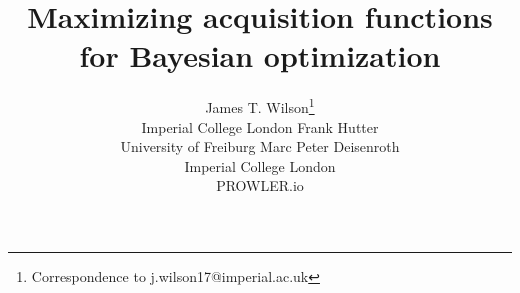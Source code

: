 
\title{Maximizing acquisition functions\\ for Bayesian optimization}
\author{
 	James T. Wilson\thanks{Correspondence to j.wilson17@imperial.ac.uk} \\
    {Imperial College London}
 	\And
 	Frank Hutter\\
    {University of Freiburg}
 	\And
 	Marc Peter Deisenroth\\
    {Imperial College London}\\
    {PROWLER.io}
}